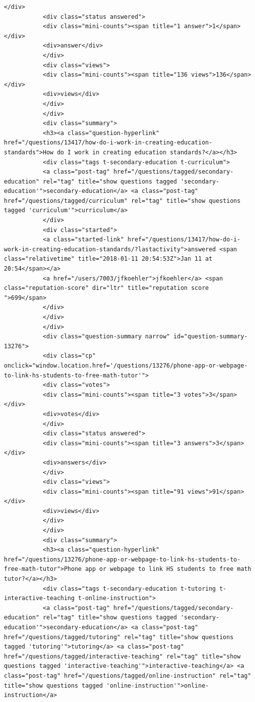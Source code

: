 \documentclass[11pt]{article}
\begin{document}
\begin{Verbatim}[commandchars=\\\{\}]
           </div>
           <div class="status answered">
           <div class="mini-counts"><span title="1 answer">1</span></div>
           <div>answer</div>
           </div>
           <div class="views">
           <div class="mini-counts"><span title="136 views">136</span></div>
           <div>views</div>
           </div>
           </div>
           <div class="summary">
           <h3><a class="question-hyperlink" href="/questions/13417/how-do-i-work-in-creating-education-standards">How do I work in creating education standards?</a></h3>
           <div class="tags t-secondary-education t-curriculum">
           <a class="post-tag" href="/questions/tagged/secondary-education" rel="tag" title="show questions tagged 'secondary-education'">secondary-education</a> <a class="post-tag" href="/questions/tagged/curriculum" rel="tag" title="show questions tagged 'curriculum'">curriculum</a>
           </div>
           <div class="started">
           <a class="started-link" href="/questions/13417/how-do-i-work-in-creating-education-standards/?lastactivity">answered <span class="relativetime" title="2018-01-11 20:54:53Z">Jan 11 at 20:54</span></a>
           <a href="/users/7003/jfkoehler">jfkoehler</a> <span class="reputation-score" dir="ltr" title="reputation score ">699</span>
           </div>
           </div>
           </div>
           <div class="question-summary narrow" id="question-summary-13276">
           <div class="cp" onclick="window.location.href='/questions/13276/phone-app-or-webpage-to-link-hs-students-to-free-math-tutor'">
           <div class="votes">
           <div class="mini-counts"><span title="3 votes">3</span></div>
           <div>votes</div>
           </div>
           <div class="status answered">
           <div class="mini-counts"><span title="3 answers">3</span></div>
           <div>answers</div>
           </div>
           <div class="views">
           <div class="mini-counts"><span title="91 views">91</span></div>
           <div>views</div>
           </div>
           </div>
           <div class="summary">
           <h3><a class="question-hyperlink" href="/questions/13276/phone-app-or-webpage-to-link-hs-students-to-free-math-tutor">Phone app or webpage to link HS students to free math tutor?</a></h3>
           <div class="tags t-secondary-education t-tutoring t-interactive-teaching t-online-instruction">
           <a class="post-tag" href="/questions/tagged/secondary-education" rel="tag" title="show questions tagged 'secondary-education'">secondary-education</a> <a class="post-tag" href="/questions/tagged/tutoring" rel="tag" title="show questions tagged 'tutoring'">tutoring</a> <a class="post-tag" href="/questions/tagged/interactive-teaching" rel="tag" title="show questions tagged 'interactive-teaching'">interactive-teaching</a> <a class="post-tag" href="/questions/tagged/online-instruction" rel="tag" title="show questions tagged 'online-instruction'">online-instruction</a>

\end{Verbatim}
\end{document}
